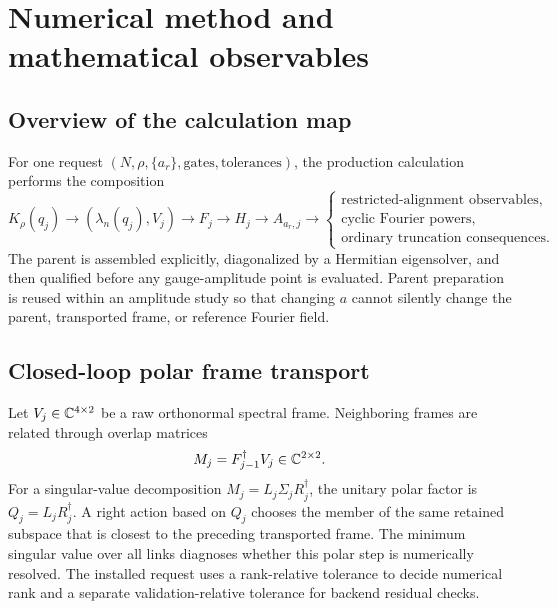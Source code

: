 \section{Numerical method and mathematical observables}

\subsection{Overview of the calculation map}

For one request $(N,\rho,\{a_r\},\text{gates},\text{tolerances})$, the production
calculation performs the composition
\begin{equation}
 K_\rho(q_j)
 \longrightarrow (\lambda_n(q_j),V_j)
 \longrightarrow F_j
 \longrightarrow H_j
 \longrightarrow A_{a_r,j}
 \longrightarrow
 \begin{cases}
  \text{restricted-alignment observables},\\
  \text{cyclic Fourier powers},\\
  \text{ordinary truncation consequences}.
 \end{cases}
 \label{eq:calculation-map}
\end{equation}
The parent is assembled explicitly, diagonalized by a Hermitian eigensolver, and then
qualified before any gauge-amplitude point is evaluated.  Parent preparation is reused
within an amplitude study so that changing $a$ cannot silently change the parent,
transported frame, or reference Fourier field.

\subsection{Closed-loop polar frame transport}

Let $V_j\in\mathbb C^{4\times2}$ be a raw orthonormal spectral frame.  Neighboring frames
are related through overlap matrices
\begin{equation}
 M_j=F_{j-1}^\dagger V_j\in\mathbb C^{2\times2}.
 \label{eq:neighbor-overlap}
\end{equation}
For a singular-value decomposition $M_j=L_j\Sigma_jR_j^\dagger$, the unitary polar
factor is $Q_j=L_jR_j^\dagger$.  A right action based on $Q_j$ chooses the member of the
same retained subspace that is closest to the preceding transported frame.  The minimum
singular value over all links diagnoses whether this polar step is numerically resolved.
The installed request uses a rank-relative tolerance to decide numerical rank and a
separate validation-relative tolerance for backend residual checks.

